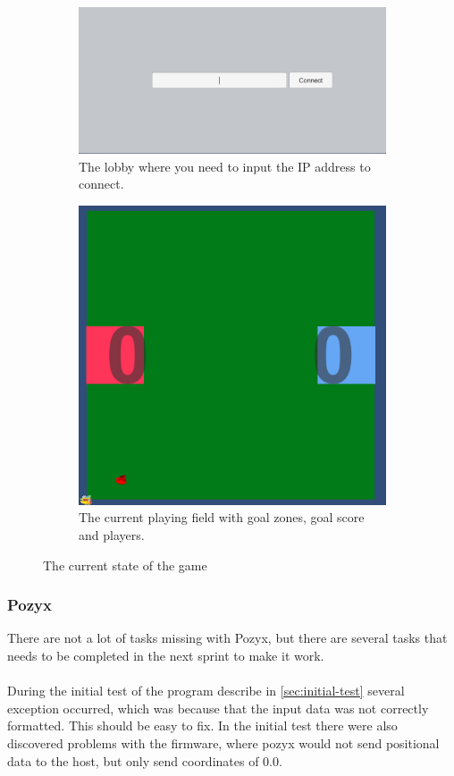 \begin{figure}[H]
    \centering
    \begin{subfigure}{.5\textwidth}
        \centering
        \includegraphics[width=1\linewidth]{figures/sprint-4-lobby.PNG}
        \caption{The lobby where you need to input the IP address to connect.}
        \label{fig:sprint-4-lobby}
    \end{subfigure}
    \begin{subfigure}{.4\textwidth}
        \centering
        \includegraphics[width=.8\linewidth]{figures/sprint-4-game.PNG}
        \caption{The current playing field with goal zones, goal score and players.}
        \label{fig:sprint-4-game}
    \end{subfigure}
    \caption{The current state of the game}
    \label{fig:sprint-4-state-of-game}
\end{figure}

\subsubsection{Pozyx}
There are not a lot of tasks missing with Pozyx, but there are several tasks that needs to be completed in the next sprint to make it work.
\\\\
During the initial test of the program describe in \autoref{sec:initial-test} several exception occurred, which was because that the input data was not correctly formatted.
This should be easy to fix.
In the initial test there were also discovered problems with the firmware, where pozyx would not send positional data to the host, but only send coordinates of 0.0.

